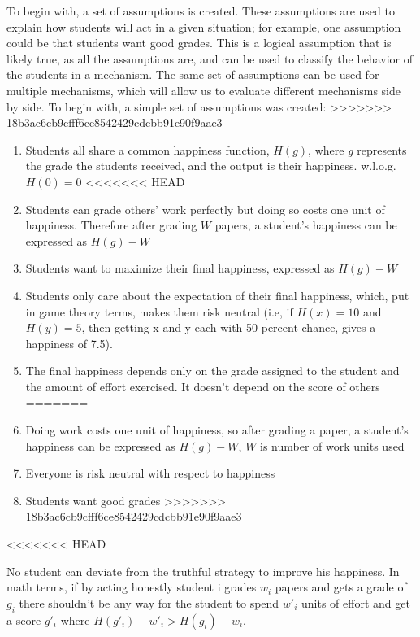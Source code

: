 \documentclass[12pt, Arial]{article}
\begin{document}
To begin with, a set of assumptions is created. These assumptions are used to explain how students will act in a given situation; for example, one assumption could be that students want good grades. This is a logical assumption that is likely true, as all the assumptions are, and can be used to classify the behavior of the students in a mechanism. The same set of assumptions can be used for multiple mechanisms, which will allow us to evaluate different mechanisms side by side. To begin with, a simple set of assumptions was created:
>>>>>>> 18b3ac6cb9cfff6ce8542429cdcbb91e90f9aae3
\begin{enumerate}
  \item Students all share a common happiness function, $H(g)$, where \emph{g} represents the grade the students received, and the output is their happiness. w.l.o.g. $H(0)=0$
<<<<<<< HEAD
  \item Students can grade others' work perfectly but doing so costs one unit of happiness. Therefore after grading $W$ papers, a student's happiness can be expressed as $H(g)-W$
  \item Students want to maximize their final happiness, expressed as $H(g)-W$
  \item Students only care about the expectation of their final happiness, which, put in game theory terms, makes them risk neutral (i.e, if $H(x)=10$ and $H(y)=5$, then getting x and y each with 50 percent chance, gives a happiness of 7.5).
  \item The final happiness depends only on the grade assigned to the student and the amount of effort exercised. It doesn't depend on the score of others
=======
  \item Doing work costs one unit of happiness, so after grading a paper, a student's happiness can be expressed as $H(g)-W$, $W$ is number of work units used
  \item Everyone is risk neutral with respect to happiness
  \item Students want good grades
>>>>>>> 18b3ac6cb9cfff6ce8542429cdcbb91e90f9aae3
\end{enumerate}


<<<<<<< HEAD

No student can deviate from the truthful strategy to improve his happiness. In math terms, if by acting honestly student i grades $w_i$ papers and gets a grade of $g_i$ there shouldn't be any way for the student to spend $w'_i$ units of effort and get a score $g'_i$ where $H(g'_i)-w'_i > H(g_i)-w_i$.
\end{document}
